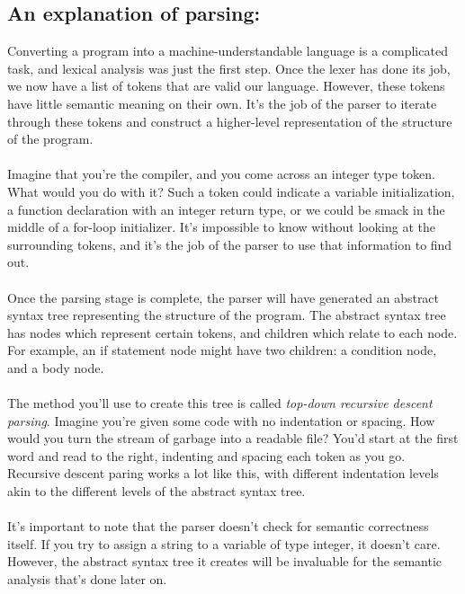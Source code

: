 \documentclass[
	12pt, %
]{fphw}
\begin{document}
\subsection*{An explanation of parsing:}
Converting a program into a machine-understandable language is a complicated task, and lexical analysis was just the first step. Once the lexer has done its job, we now have a list of tokens that are valid our language. However, these tokens have little semantic meaning on their own. It's the job of the parser to iterate through these tokens and construct a higher-level representation of the structure of the program.  \\
\\
Imagine that you're the compiler, and you come across an integer type token. What would you do with it? Such a token could indicate a variable initialization, a function declaration with an integer return type, or we could be smack in the middle of a for-loop initializer. It's impossible to know without looking at the surrounding tokens, and it's the job of the parser to use that information to find out. \\
\\
Once the parsing stage is complete, the parser will have generated an abstract syntax tree representing the structure of the program. The abstract syntax tree has nodes which represent certain tokens, and children which relate to each node. For example, an if statement node might have two children: a condition node, and a body node. \\
\\
The method you'll use to create this tree is called \textit{top-down recursive descent parsing}. Imagine you're given some code with no indentation or spacing. How would you turn the stream of garbage into a readable file? You'd start at the first word and read to the right, indenting and spacing each token as you go. Recursive descent paring works a lot like this, with different indentation levels akin to the different levels of the abstract syntax tree.\\
\\
It's important to note that the parser doesn't check for semantic correctness itself. If you try to assign a string to a variable of type integer, it doesn't care. However, the abstract syntax tree it creates will be invaluable for the semantic analysis that's done later on.
\\

\end{document}
